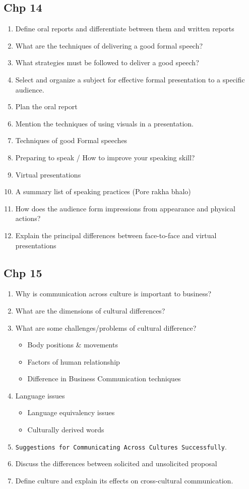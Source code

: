\documentclass[11pt]{article}
\begin{document}
\subsection{Chp 14}
\label{sec:org578caf9}
\begin{enumerate}
\item Define oral reports and differentiate between them and written reports
\item What are the techniques of delivering a good formal speech?
\item What strategies must be followed to deliver a good speech?
\item Select and organize a subject for effective formal presentation to a specific audience.
\item Plan the oral report
\item Mention the techniques of using visuals in a presentation.
\item Techniques of good Formal speeches
\item Preparing to speak / How to improve your speaking skill?
\item Virtual presentations
\item A summary list of speaking practices (Pore rakha bhalo)
\item How does the audience form impressions from appearance and physical actions?
\item Explain the principal differences between face-to-face and virtual presentations
\end{enumerate}

\subsection{Chp 15}
\label{sec:org27680bd}
\begin{enumerate}
\item Why is communication across culture is important to business?
\item What are the dimensions of cultural differences?
\item What are some challenges/problems of cultural difference?
\begin{itemize}
\item Body positions \& movements
\item Factors of human relationship
\item Difference in Business Communication techniques
\end{itemize}
\item Language issues
\begin{itemize}
\item Language equivalency issues
\item Culturally derived words
\end{itemize}
\item \texttt{Suggestions for Communicating Across Cultures Successfully}.
\item Discuss the differences between solicited and unsolicited proposal
\item Define culture and explain its effects on cross-cultural communication.
\end{enumerate}
\end{document}
